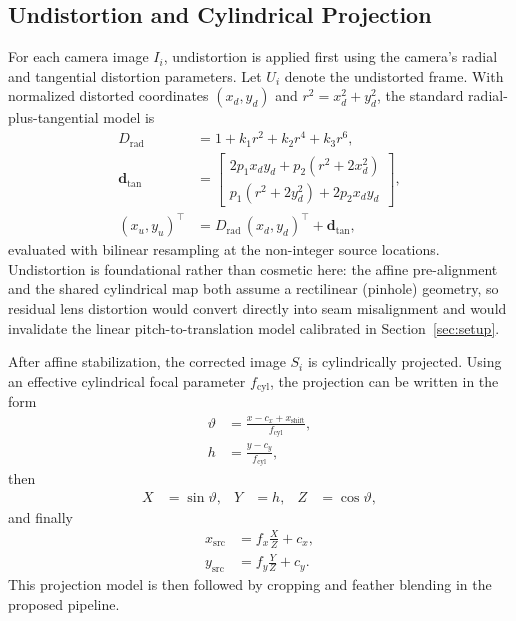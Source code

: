 \documentclass[journal]{IEEEtran}
\begin{document}
\subsection{Undistortion and Cylindrical Projection}
For each camera image $I_i$, undistortion is applied first using the camera's radial and tangential distortion parameters. Let $U_i$ denote the undistorted frame. With normalized distorted coordinates $(x_d,y_d)$ and $r^2 = x_d^2 + y_d^2$, the standard radial-plus-tangential model is
\begin{align}
 D_{\mathrm{rad}} &= 1 + k_1 r^2 + k_2 r^4 + k_3 r^6,\\
 \mathbf{d}_{\mathrm{tan}} &=
 \begin{bmatrix}
 2p_1 x_d y_d + p_2(r^2+2x_d^2)\\[1pt]
 p_1(r^2+2y_d^2) + 2p_2 x_d y_d
 \end{bmatrix},\\
 (x_u,y_u)^\top &= D_{\mathrm{rad}}\,(x_d,y_d)^\top + \mathbf{d}_{\mathrm{tan}},
 \label{eq:undist}
\end{align}
evaluated with bilinear resampling at the non-integer source locations. Undistortion is foundational rather than cosmetic here: the affine pre-alignment and the shared cylindrical map both assume a rectilinear (pinhole) geometry, so residual lens distortion would convert directly into seam misalignment and would invalidate the linear pitch-to-translation model calibrated in Section~\ref{sec:setup}.

After affine stabilization, the corrected image $S_i$ is cylindrically projected. Using an effective cylindrical focal parameter $f_{\mathrm{cyl}}$, the projection can be written in the form
\begin{align}
 \vartheta &= \frac{x - c_x + x_{\mathrm{shift}}}{f_{\mathrm{cyl}}}, \\
 h &= \frac{y-c_y}{f_{\mathrm{cyl}}},
\end{align}
then
\begin{align}
 X &= \sin\vartheta,
 &Y &= h,
 &Z &= \cos\vartheta,
\end{align}
and finally
\begin{align}
 x_{\mathrm{src}} &= f_x \frac{X}{Z} + c_x, \\
 y_{\mathrm{src}} &= f_y \frac{Y}{Z} + c_y.
\end{align}
This projection model is then followed by cropping and feather blending in the proposed pipeline.
\end{document}
